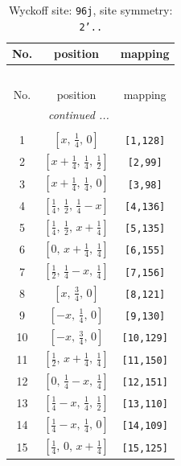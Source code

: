 \documentclass[fleqn,8pt]{jsarticle}
\begin{document}
\begin{longtable}{ccc}
\caption{Wyckoff site: {\tt 96j}, site symmetry: {\tt 2'..}}
 \\
 \hline \hline
No. & position & mapping \\ \hline \endfirsthead

\multicolumn{2}{l}{\tablename\ \thetable{}} \\
 \hline \hline
No. & position & mapping \\ \hline \endhead

 \hline \hline
\multicolumn{2}{r}{\footnotesize\it continued ...} \\ \endfoot

 \hline \hline
\multicolumn{2}{r}{} \\ \endlastfoot

1 & $\left[ x,\, \frac{1}{4},\, 0 \right]$ & {\tt [1,128]} \\ \hline
2 & $\left[ x + \frac{1}{4},\, \frac{1}{4},\, \frac{1}{2} \right]$ & {\tt [2,99]} \\ \hline
3 & $\left[ x + \frac{1}{4},\, \frac{1}{4},\, 0 \right]$ & {\tt [3,98]} \\ \hline
4 & $\left[ \frac{1}{4},\, \frac{1}{2},\, \frac{1}{4} - x \right]$ & {\tt [4,136]} \\ \hline
5 & $\left[ \frac{1}{4},\, \frac{1}{2},\, x + \frac{1}{4} \right]$ & {\tt [5,135]} \\ \hline
6 & $\left[ 0,\, x + \frac{1}{4},\, \frac{1}{4} \right]$ & {\tt [6,155]} \\ \hline
7 & $\left[ \frac{1}{2},\, \frac{1}{4} - x,\, \frac{1}{4} \right]$ & {\tt [7,156]} \\ \hline
8 & $\left[ x,\, \frac{3}{4},\, 0 \right]$ & {\tt [8,121]} \\ \hline
9 & $\left[ - x,\, \frac{1}{4},\, 0 \right]$ & {\tt [9,130]} \\ \hline
10 & $\left[ - x,\, \frac{3}{4},\, 0 \right]$ & {\tt [10,129]} \\ \hline
11 & $\left[ \frac{1}{2},\, x + \frac{1}{4},\, \frac{1}{4} \right]$ & {\tt [11,150]} \\ \hline
12 & $\left[ 0,\, \frac{1}{4} - x,\, \frac{1}{4} \right]$ & {\tt [12,151]} \\ \hline
13 & $\left[ \frac{1}{4} - x,\, \frac{1}{4},\, \frac{1}{2} \right]$ & {\tt [13,110]} \\ \hline
14 & $\left[ \frac{1}{4} - x,\, \frac{1}{4},\, 0 \right]$ & {\tt [14,109]} \\ \hline
15 & $\left[ \frac{1}{4},\, 0,\, x + \frac{1}{4} \right]$ & {\tt [15,125]} \\ \hline

\end{longtable}
\end{document}
